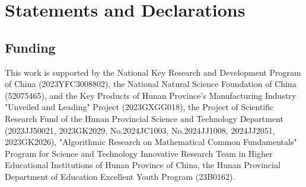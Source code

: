 \documentclass[pdflatex,sn-mathphys-num]{sn-jnl}%
\theoremstyle{thmstyleone}%
\theoremstyle{thmstyletwo}%
\theoremstyle{thmstylethree}%
\begin{document}





% 


% 
\section*{Statements and Declarations}
\subsection*{Funding}

This work is supported by the National Key Research and Development Program of China (2023YFC3008802), the National Natural Science Foundation of China (52075465), and the Key Products of Hunan Province's Manufacturing Industry "Unveiled and Leading" Project (2023GXGG018), the Project of Scientific Research Fund of the Hunan Provincial Science and Technology Department (2023JJ50021, 2023GK2029, No.2024JC1003, No.2024JJ1008, 2024JJ2051, 2023GK2026), "Algorithmic Research on Mathematical Common Fundamentals" Program for Science and Technology Innovative Research Team in Higher Educational Institutions of Hunan Province of China, the Hunan Provincial Department of Education Excellent Youth Program (23B0162).
\end{document}
